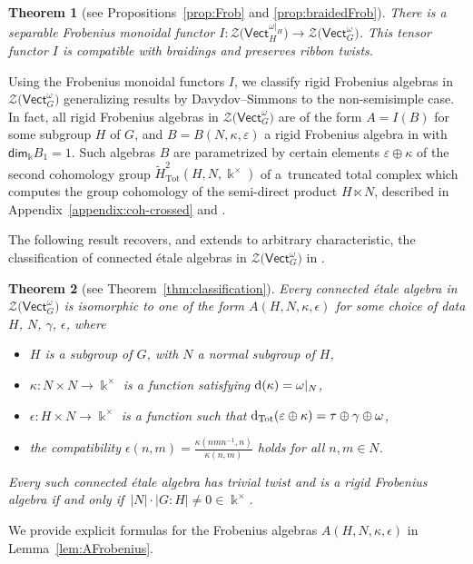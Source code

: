 \documentclass[10pt,a4paper]{amsart}
\numberwithin{equation}{section}
\newcommand{\deri}{{\rm d}}
\newcommand{\Tot}{\mathrm{Tot}}
\renewcommand{\dim}{\mathsf{dim}}
\newcommand{\Vect}{\mathsf{Vect}}
\newcommand{\cZ}{\mathcal{Z}}
\newcommand{\rI}{I}
\newtheorem*{theorem*}{Theorem}
\begin{document}
\begin{theorem*}[see Propositions~\ref{prop:Frob} and \ref{prop:braidedFrob}]%
There is a separable Frobenius monoidal functor $\rI\colon \cZ\big(\Vect_H^{\omega|_{H}}\big)\to \cZ\big(\Vect_G^\omega\big)$. This tensor functor $\rI$ is compatible with braidings and preserves ribbon twists.
\end{theorem*}

Using the Frobenius monoidal functors $\rI$, we classify rigid Frobenius algebras in $\cZ\big(\Vect_G^\omega\big)$ generalizing results by Davydov--Simmons \cite{DS} to the non-semisimple case. In fact, all rigid Frobenius algebras in $\cZ\big(\Vect_G^\omega\big)$ are of the form $A=\rI(B)$ for some subgroup $H$ of $G$, and $B=B(N,\kappa,\varepsilon)$ a rigid Frobenius algebra in \smash{$\cZ\big(\Vect_H^{\omega|_H}\big)$} with $\dim_{\Bbbk}B_1=1$. Such algebras $B$ are parametrized by certain elements $\varepsilon\oplus \kappa$ of the second cohomology group $\widetilde{H}^2_{\Tot}(H,N,\Bbbk^\times)$ of a~truncated total complex \smash{$\big(\widetilde{F}^\bullet_{\Tot}(H,N,\Bbbk^\times), \deri_{\Tot}\big)$} which computes the group cohomology of the semi-direct product $H\ltimes N$, described in Appendix~\ref{appendix:coh-crossed} and \cite[Appendix~A]{DS}.

The following result recovers, and extends to arbitrary characteristic, the classification of connected \'etale algebras in $\cZ\big(\Vect_G^\omega\big)$ in \cite[Theorem~3.15]{DS}.

\begin{theorem*}[see Theorem~\ref{thm:classification}]\label{thm2}
Every connected \'etale algebra in $\cZ\big(\Vect_G^\omega\big)$ is isomorphic to one of the form $A(H,N,\kappa, \epsilon)$ for some choice of data $H$, $N$, $\gamma$, $\epsilon$, where
\begin{itemize}\itemsep=0pt
 \item $H$ is a subgroup of $G$, with $N$ a normal subgroup of $H$,
 \item $\kappa\colon N\times N\to \Bbbk^\times$ is a function satisfying $\deri(\kappa)=\omega|_N$,
 \item $\epsilon\colon H\times N \to \Bbbk^\times$ is a function such that
 $\deri_{\Tot}(\varepsilon\oplus\kappa)=\tau\oplus \gamma \oplus \omega$,
 \item the compatibility $\epsilon(n,m)=\frac{\kappa(nmn^{-1},n)}{\kappa(n,m)}$ holds for all $n,m\in N$.
\end{itemize}
Every such connected \'etale algebra has trivial twist and is a rigid Frobenius algebra if and only if~$|N|\cdot |G:H|\neq 0 \in \Bbbk^{\times}$.
\end{theorem*}
We provide explicit formulas for the Frobenius algebras $A(H,N,\kappa,\epsilon)$ in Lemma~\ref{lem:AFrobenius}.
\end{document}
